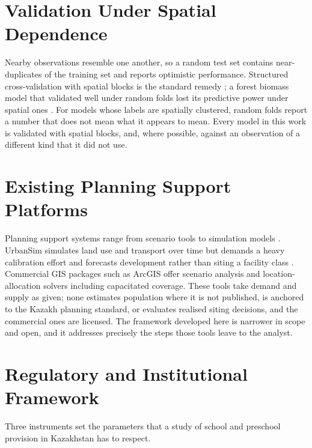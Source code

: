 \section{Validation Under Spatial Dependence}
\label{sec:spatial-validation}

Nearby observations resemble one another, so a random test set contains near-duplicates of the training set and reports optimistic performance. Structured cross-validation with spatial blocks is the standard remedy \cite{roberts2017}; a forest biomass model that validated well under random folds lost its predictive power under spatial ones \cite{ploton2020}. For models whose labels are spatially clustered, random folds report a number that does not mean what it appears to mean. Every model in this work is validated with spatial blocks, and, where possible, against an observation of a different kind that it did not use.

\section{Existing Planning Support Platforms}
\label{sec:existing-systems}

Planning support systems range from scenario tools to simulation models \cite{geertman2004}. UrbanSim simulates land use and transport over time but demands a heavy calibration effort and forecasts development rather than siting a facility class \cite{waddell2002}. Commercial GIS packages such as ArcGIS offer scenario analysis and location-allocation solvers including capacitated coverage. These tools take demand and supply as given; none estimates population where it is not published, is anchored to the Kazakh planning standard, or evaluates realised siting decisions, and the commercial ones are licensed. The framework developed here is narrower in scope and open, and it addresses precisely the steps those tools leave to the analyst.

\section{Regulatory and Institutional Framework}
\label{sec:regulatory}

Three instruments set the parameters that a study of school and preschool provision in Kazakhstan has to respect.

